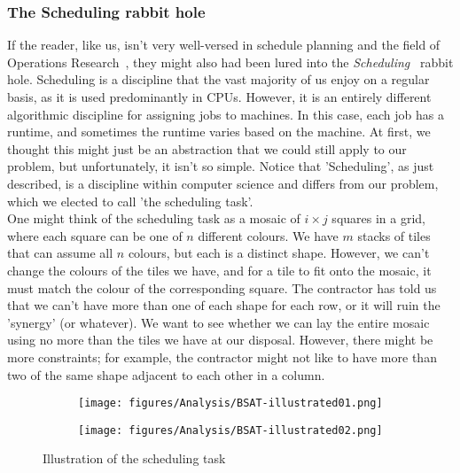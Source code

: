 \subsubsection*{The Scheduling rabbit hole}
If the reader, like us, isn't very well-versed in schedule planning and the field of Operations Research~\cite{Wiki-Operations-Research}, they might also had been lured into the \emph{Scheduling}~\cite{Wiki-Scheduling-computing, Wiki-Optimal-job-scheduling, Wiki-Job-shop-scheduling} rabbit hole. Scheduling is a discipline that the vast majority of us enjoy on a regular basis, as it is used predominantly in CPUs. However, it is an entirely different algorithmic discipline for assigning jobs to machines. In this case, each job has a runtime, and sometimes the runtime varies based on the machine. At first, we thought this might just be an abstraction that we could still apply to our problem, but unfortunately, it isn't so simple. Notice that 'Scheduling', as just described, is a discipline within computer science and differs from our problem, which we elected to call 'the scheduling task'.
\\
One might think of the scheduling task as a mosaic of \(i \times j\) squares in a grid, where each square can be one of \(n\) different colours. We have \(m\) stacks of tiles that can assume all \(n\) colours, but each is a distinct shape. However, we can't change the colours of the tiles we have, and for a tile to fit onto the mosaic, it must match the colour of the corresponding square. The contractor has told us that we can't have more than one of each shape for each row, or it will ruin the 'synergy' (or whatever). We want to see whether we can lay the entire mosaic using no more than the tiles we have at our disposal. However, there might be more constraints; for example, the contractor might not like to have more than two of the same shape adjacent to each other in a column.
\begin{figure}[H]
    \centering
    \begin{subfigure}[t]{0.73\textwidth}
        \centering
        \texttt{[image: figures/Analysis/BSAT-illustrated01.png]}
    \end{subfigure}
    \hfill
    \begin{subfigure}[t]{0.225\textwidth}
        \centering
        \texttt{[image: figures/Analysis/BSAT-illustrated02.png]}
    \end{subfigure}
    \caption{Illustration of the scheduling task}
    \label{fig:the-scheduling-task-illustrated}
\end{figure}
